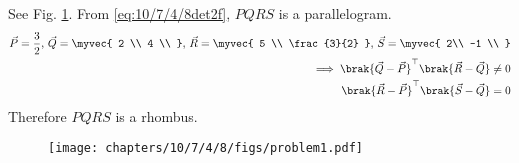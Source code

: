 \solution 
See Fig. \ref{fig:10/7/4/8Fig3}. From 
  \eqref{eq:10/7/4/8det2f}, $PQRS$ is a parallelogram.
\begin{align}
  \vec{P}  = 
 \frac{3}{2},\, 
 \vec{Q}  = \myvec{
 2 \\
 4 \\
 } ,\,
 \vec{R}  = \myvec{
 5 \\
 \frac{3}{2}
 }   
  ,\,
 \vec{S}  = \myvec{
 2\\
 -1 \\
 }   
 \\
	\implies 
 \brak{\vec{Q}-\vec{P}}^\top\brak{\vec{R}-\vec{Q}}  \neq 0
 \\
 \brak{\vec{R}-\vec{P}}^\top\brak{\vec{S}-\vec{Q}}  = 0
\end{align}
Therefore $PQRS$ is a rhombus.
\begin{figure}[H]
	\begin{center}
		\texttt{[image: chapters/10/7/4/8/figs/problem1.pdf]}
	\end{center}
\caption{}
\label{fig:10/7/4/8Fig3}
\end{figure}

